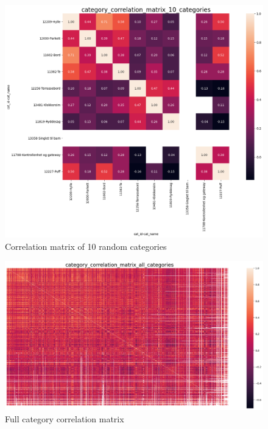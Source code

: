 \begin{figure}[h!]
  \centering
  \includegraphics[width=\textwidth]{./figs/code_generated/data_exploration/category_correlation_matrix_10_categories.png}
  \hfill
  \caption{Correlation matrix of 10 random categories}
  \label{fig:category_corelation_matrix_10}
\end{figure}


\begin{figure}[h!]
  \centering
  \includegraphics[width=\textwidth]{./figs/code_generated/data_exploration/category_correlation_matrix_all_categories.png}
  \hfill
  \caption{Full category correlation matrix}
  \label{fig:category_corelation_matrix_full}
\end{figure}
